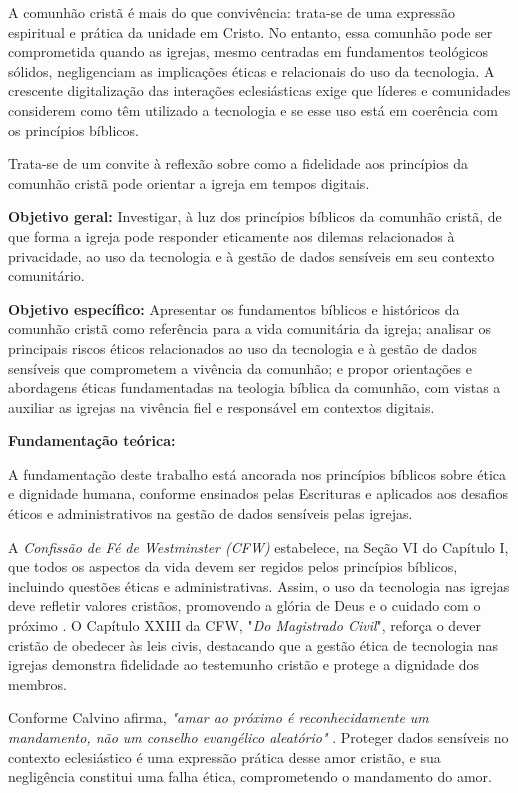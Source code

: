 \documentclass[12pt,a4paper]{article}
\begin{document}
A comunhão cristã é mais do que convivência: trata-se de uma expressão espiritual e prática da unidade em Cristo. No entanto, essa comunhão pode ser comprometida quando as igrejas, mesmo centradas em fundamentos teológicos sólidos, negligenciam as implicações éticas e relacionais do uso da tecnologia. A crescente digitalização das interações eclesiásticas exige que líderes e comunidades considerem como têm utilizado a tecnologia e se esse uso está em coerência com os princípios bíblicos.

Trata-se de um convite à reflexão sobre como a fidelidade aos princípios da comunhão cristã pode orientar a igreja em tempos digitais.

\noindent
\textbf{Objetivo geral:} Investigar, à luz dos princípios bíblicos da comunhão cristã, de que forma a igreja pode responder eticamente aos dilemas relacionados à privacidade, ao uso da tecnologia e à gestão de dados sensíveis em seu contexto comunitário.

\noindent
\textbf{Objetivo específico:} Apresentar os fundamentos bíblicos e históricos da comunhão cristã como referência para a vida comunitária da igreja; analisar os principais riscos éticos relacionados ao uso da tecnologia e à gestão de dados sensíveis que comprometem a vivência da comunhão; e propor orientações e abordagens éticas fundamentadas na teologia bíblica da comunhão, com vistas a auxiliar as igrejas na vivência fiel e responsável em contextos digitais.

\noindent
\textbf{Fundamentação teórica:}

A fundamentação deste trabalho está ancorada nos princípios bíblicos sobre ética e dignidade humana, conforme ensinados pelas Escrituras e aplicados aos desafios éticos e administrativos na gestão de dados sensíveis pelas igrejas.

A \textit{Confissão de Fé de Westminster (CFW)} estabelece, na Seção VI do Capítulo I, que todos os aspectos da vida devem ser regidos pelos princípios bíblicos, incluindo questões éticas e administrativas. Assim, o uso da tecnologia nas igrejas deve refletir valores cristãos, promovendo a glória de Deus e o cuidado com o próximo \cite{cfw}. O Capítulo XXIII da CFW, "\textit{Do Magistrado Civil}", reforça o dever cristão de obedecer às leis civis, destacando que a gestão ética de tecnologia nas igrejas demonstra fidelidade ao testemunho cristão e protege a dignidade dos membros.

Conforme Calvino afirma, \textit{"amar ao próximo é reconhecidamente um mandamento, não um conselho evangélico aleatório"} \cite[p. 453]{calvino2022}. Proteger dados sensíveis no contexto eclesiástico é uma expressão prática desse amor cristão, e sua negligência constitui uma falha ética, comprometendo o mandamento do amor.
\end{document}
